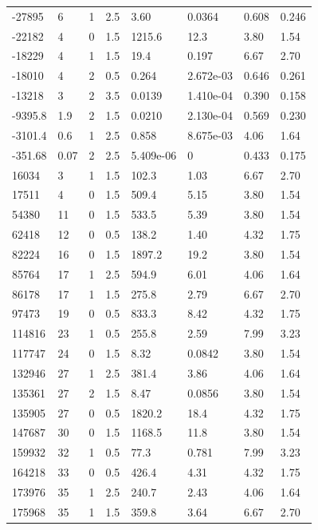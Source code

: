 \documentclass[preview]{standalone}
\begin{document}
{{\begin{tabular}{L{1.2cm}C{1.2cm} C{0.3cm}C{0.5cm} C{1.4cm}C{1.4cm} C{1.4cm}C{1.4cm}}
  -27895  &     6  & 1     & 2.5 &  3.60  & 0.0364  & 0.608 &  0.246   \\ 
  -22182  &     4  & 0     & 1.5 &  1215.6  & 12.3  & 3.80 &  1.54   \\ 
  -18229  &     4  & 1     & 1.5 &  19.4  & 0.197  & 6.67 &  2.70   \\ 
  -18010  &     4  & 2     & 0.5 &  0.264  & 2.672e-03  & 0.646 &  0.261   \\ 
  -13218  &     3  & 2     & 3.5 &  0.0139  & 1.410e-04  & 0.390 &  0.158   \\ 
  -9395.8  &   1.9  & 2     & 1.5 &  0.0210  & 2.130e-04  & 0.569 &  0.230   \\ 
  -3101.4  &   0.6  & 1     & 2.5 &  0.858  & 8.675e-03  & 4.06 &  1.64   \\ 
  -351.68  &  0.07  & 2     & 2.5 &  5.409e-06  & 0  & 0.433 &  0.175   \\ 
  16034  &     3  & 1     & 1.5 &  102.3  & 1.03  & 6.67 &  2.70   \\ 
  17511  &     4  & 0     & 1.5 &  509.4  & 5.15  & 3.80 &  1.54   \\ 
  54380  &    11  & 0     & 1.5 &  533.5  & 5.39  & 3.80 &  1.54   \\ 
  62418  &    12  & 0     & 0.5 &  138.2  & 1.40  & 4.32 &  1.75   \\ 
  82224  &    16  & 0     & 1.5 &  1897.2  & 19.2  & 3.80 &  1.54   \\ 
  85764  &    17  & 1     & 2.5 &  594.9  & 6.01  & 4.06 &  1.64   \\ 
  86178  &    17  & 1     & 1.5 &  275.8  & 2.79  & 6.67 &  2.70   \\ 
  97473  &    19  & 0     & 0.5 &  833.3  & 8.42  & 4.32 &  1.75   \\ 
  114816  &    23  & 1     & 0.5 &  255.8  & 2.59  & 7.99 &  3.23   \\ 
  117747  &    24  & 0     & 1.5 &  8.32  & 0.0842  & 3.80 &  1.54   \\ 
  132946  &    27  & 1     & 2.5 &  381.4  & 3.86  & 4.06 &  1.64   \\ 
  135361  &    27  & 2     & 1.5 &  8.47  & 0.0856  & 3.80 &  1.54   \\ 
  135905  &    27  & 0     & 0.5 &  1820.2  & 18.4  & 4.32 &  1.75   \\ 
  147687  &    30  & 0     & 1.5 &  1168.5  & 11.8  & 3.80 &  1.54   \\ 
  159932  &    32  & 1     & 0.5 &  77.3  & 0.781  & 7.99 &  3.23   \\ 
  164218  &    33  & 0     & 0.5 &  426.4  & 4.31  & 4.32 &  1.75   \\ 
  173976  &    35  & 1     & 2.5 &  240.7  & 2.43  & 4.06 &  1.64   \\ 
  175968  &    35  & 1     & 1.5 &  359.8  & 3.64  & 6.67 &  2.70   \\ 
\hline 
\end{tabular} 

}}
\end{document}
